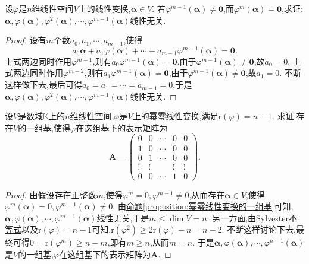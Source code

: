 \documentclass[../../main.tex]{subfiles}%
\begin{document}
\begin{proposition}\label{proposition:幂零线性变换的一组基}
设\(\varphi\)是\(n\)维线性空间\(V\)上的线性变换,\(\boldsymbol{\alpha}\in V\). 若\(\varphi^{m - 1}(\boldsymbol{\alpha})\neq\boldsymbol{0}\),而\(\varphi^{m}(\boldsymbol{\alpha})=\boldsymbol{0}\),求证:\(\boldsymbol{\alpha},\varphi(\boldsymbol{\alpha}),\varphi^{2}(\boldsymbol{\alpha}),\cdots,\varphi^{m - 1}(\boldsymbol{\alpha})\)线性无关.
\end{proposition}
\begin{proof}

设有\(m\)个数\(a_0,a_1,\cdots,a_{m - 1}\),使得
\[
a_0\boldsymbol{\alpha}+a_1\varphi(\boldsymbol{\alpha})+\cdots+a_{m - 1}\varphi^{m - 1}(\boldsymbol{\alpha})=\boldsymbol{0}.
\]
上式两边同时作用\(\varphi^{m - 1}\),则有\(a_0\varphi^{m - 1}(\boldsymbol{\alpha})=\boldsymbol{0}\),由于\(\varphi^{m - 1}(\boldsymbol{\alpha})\neq\boldsymbol{0}\),故\(a_0 = 0\). 上式两边同时作用\(\varphi^{m - 2}\),则有\(a_1\varphi^{m - 1}(\boldsymbol{\alpha})=\boldsymbol{0}\),由于\(\varphi^{m - 1}(\boldsymbol{\alpha})\neq\boldsymbol{0}\),故\(a_1 = 0\). 不断这样做下去,最后可得\(a_0 = a_1=\cdots=a_{m - 1}=0\),于是\(\boldsymbol{\alpha},\varphi(\boldsymbol{\alpha}),\varphi^{2}(\boldsymbol{\alpha}),\cdots,\varphi^{m - 1}(\boldsymbol{\alpha})\)线性无关.

\end{proof}

\begin{corollary}\label{corollary:幂零线性变换基的表示矩阵}
设\(V\)是数域\(\mathbb{K}\)上的\(n\)维线性空间,\(\varphi\)是\(V\)上的幂零线性变换,满足\(\mathrm{r}(\varphi)=n - 1\). 求证:存在\(V\)的一组基,使得\(\varphi\)在这组基下的表示矩阵为
\[
\boldsymbol{A}=\begin{pmatrix}
0&0&\cdots&0&0\\
1&0&\cdots&0&0\\
0&1&\cdots&0&0\\
\vdots&\vdots&&\vdots&\vdots\\
0&0&\cdots&1&0
\end{pmatrix}.
\]
\end{corollary}
\begin{proof}

由假设存在正整数\(m\),使得\(\varphi^{m}=0,\varphi^{m - 1}\neq 0\),从而存在\(\boldsymbol{\alpha}\in V\),使得\(\varphi^{m}(\boldsymbol{\alpha}) = 0,\varphi^{m - 1}(\boldsymbol{\alpha})\neq 0\). 由\hyperref[proposition:幂零线性变换的一组基]{命题\ref{proposition:幂零线性变换的一组基}}可知,\(\boldsymbol{\alpha},\varphi(\boldsymbol{\alpha}),\cdots,\varphi^{m - 1}(\boldsymbol{\alpha})\)线性无关,于是\(m\leqslant \dim V=n\). 另一方面,由\hyperref[proposition:Sylvester(西尔维斯特)不等式]{Sylvester不等式}以及\(\mathrm{r}(\varphi)=n - 1\)可知,\(\mathrm{r}(\varphi^{2})\geqslant  2\mathrm{r}(\varphi)-n=n - 2\). 不断这样讨论下去,最终可得\(0=\mathrm{r}(\varphi^{m})\geqslant  n - m\),即有\(m\geqslant  n\),从而\(m = n\). 于是\(\boldsymbol{\alpha},\varphi(\boldsymbol{\alpha}),\cdots,\varphi^{n - 1}(\boldsymbol{\alpha})\)是\(V\)的一组基,\(\varphi\)在这组基下的表示矩阵为\(\boldsymbol{A}\).

\end{proof}
\end{document}

